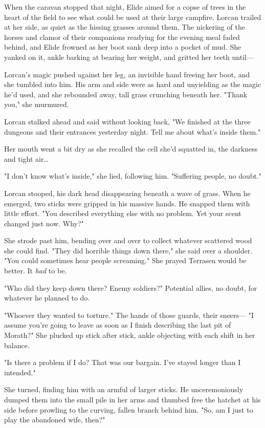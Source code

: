 When the caravan stopped that night, Elide aimed for a copse of trees in the heart of the field to see what could be used at their large campfire.
Lorcan trailed at her side, as quiet as the hissing grasses around them.
The nickering of the horses and clamor of their companions readying for the evening meal faded behind, and Elide frowned as her boot sank deep into a pocket of mud.
She yanked on it, ankle barking at bearing her weight, and gritted her teeth until---

Lorcan's magic pushed against her leg, an invisible hand freeing her boot, and she tumbled into him.
His arm and side were as hard and unyielding as the magic he'd used, and she rebounded away, tall grass crunching beneath her.
"Thank you," she murmured.

Lorcan stalked ahead and said without looking back, "We finished at the three dungeons and their entrances yesterday night.
Tell me about what's inside them."

Her mouth went a bit dry as she recalled the cell she'd squatted in, the darkness and tight air\ldots{}

"I don't know what's inside," she lied, following him.
"Suffering people, no doubt."

Lorcan stooped, his dark head disappearing beneath a wave of grass.
When he emerged, two sticks were gripped in his massive hands.
He snapped them with little effort.
"You described everything else with no problem.
Yet your scent changed just now.
Why?"

She strode past him, bending over and over to collect whatever scattered wood she could find.
"They did horrible things down there," she said over a shoulder.
"You could sometimes hear people screaming."
She prayed Terrasen would be better.
It \emph{had} to be.

"Who did they keep down there?
Enemy soldiers?"
Potential allies, no doubt, for whatever he planned to do.

"Whoever they wanted to torture."
The hands of those guards, their sneers--- "I assume you're going to leave as soon as I finish describing the last pit of Morath?"
She plucked up stick after stick, ankle objecting with each shift in her balance.

"Is there a problem if I do?
That was our bargain.
I've stayed longer than I intended."

She turned, finding him with an armful of larger sticks.
He unceremoniously dumped them into the small pile in her arms and thumbed free the hatchet at his side before prowling to the curving, fallen branch behind him.
"So, am I just to play the abandoned wife, then?"

